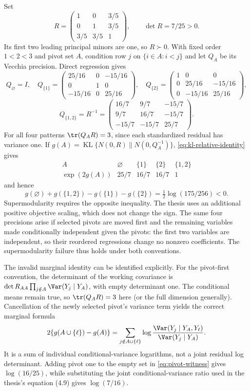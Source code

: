 Set
\begin{equation}
 R=\begin{pmatrix}1&0&3/5\\0&1&3/5\\3/5&3/5&1\end{pmatrix},
 \qquad \det R=7/25>0.
 \label{eq:pivot-witness}
\end{equation}
Its first two leading principal minors are one, so $R\succ0$.
With fixed order $1<2<3$ and pivot set $A$, condition row $j$ on
$\{i\in A:i<j\}$ and let $Q_A$ be its Vecchia precision. Direct
regression gives
\[
 Q_\varnothing=I,\quad
 Q_{\{1\}}=\begin{pmatrix}25/16&0&-15/16\\0&1&0\\-15/16&0&25/16\end{pmatrix},
 \quad
 Q_{\{2\}}=\begin{pmatrix}1&0&0\\0&25/16&-15/16\\0&-15/16&25/16\end{pmatrix},
\]
\[
 Q_{\{1,2\}}=R^{-1}
 =\begin{pmatrix}16/7&9/7&-15/7\\9/7&16/7&-15/7\\-15/7&-15/7&25/7\end{pmatrix}.
\]
For all four patterns $\tr(Q_AR)=3$, since each standardized residual has
variance one. If $g(A)=\operatorname{KL}\{N(0,R)\|N(0,Q_A^{-1})\}$,
\eqref{eq:kl-relative-identity} gives
\[
 \begin{array}{c|rrrr}
 A&\varnothing&\{1\}&\{2\}&\{1,2\}\\\hline
 \exp(2g(A))&25/7&16/7&16/7&1
 \end{array}
\]
and hence
\begin{equation}
 g(\varnothing)+g(\{1,2\})-g(\{1\})-g(\{2\})
          =\tfrac12\log(175/256)<0.
 \label{eq:pivot-supermodularity-slack}
\end{equation}
Supermodularity requires the opposite inequality. The thesis uses an
additional positive objective scaling, which does not change the sign.
The same four precisions arise if selected pivots are moved first and the
remaining variables made conditionally independent given the pivots: the
first two variables are independent, so their reordered regressions change
no nonzero coefficients. The supermodularity failure thus holds under
both conventions.

The invalid marginal identity can be identified explicitly. For the
pivot-first convention, the determinant of the working covariance is
$\det R_{AA}\prod_{j\notin A}\Var(Y_j\mid Y_A)$, with empty determinant
one. The conditional means remain true, so $\tr(Q_AR)=3$ here (or the
full dimension generally). Cancellation of the newly selected pivot's
variance term yields the correct marginal formula
\[
 2\{g(A\cup\{\ell\})-g(A)\}
 =\sum_{j\notin A\cup\{\ell\}}
 \log\frac{\Var(Y_j\mid Y_A,Y_\ell)}{\Var(Y_j\mid Y_A)}.
\]
It is a sum of individual conditional-variance logarithms, not a joint
residual log determinant. Adding pivot one to the empty set in
\eqref{eq:pivot-witness} gives $\log(16/25)$, while substituting the
joint conditional-variance ratio used in the thesis's equation (4.9)
gives $\log(7/16)$.


